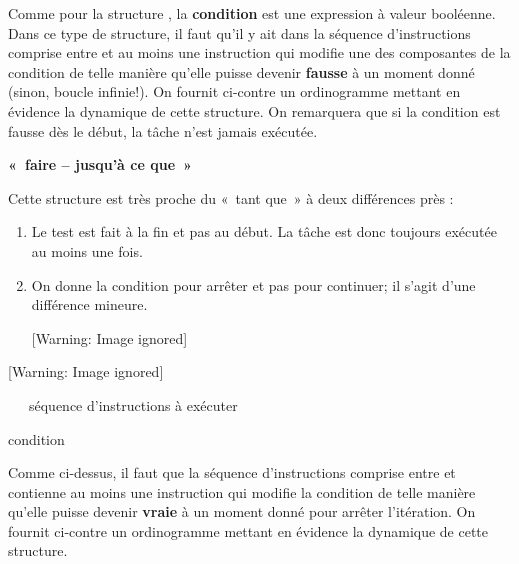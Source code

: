 {\sffamily
{}}


\bigskip

{
Comme pour la structure , la \textbf{condition} est
une expression à valeur booléenne. Dans ce type de structure, il faut
qu’il y ait dans la séquence d’instructions comprise entre
 et  au moins une
instruction qui modifie une des composantes de la condition de telle
manière qu’elle puisse devenir \textbf{fausse} à un moment donné
(sinon, boucle infinie!). On fournit ci-contre un ordinogramme mettant
en évidence la dynamique de cette structure. On remarquera que si la
condition est fausse dès le début, la tâche n'est
jamais exécutée.}

{\sffamily\bfseries\upshape
«~faire – jusqu'à ce que~»}

{
Cette structure est très proche du «~tant que~» à deux différences près
:}

\liststyleNumberingi
\begin{enumerate}
\item {
Le test est fait à la fin et pas au début. La tâche est donc toujours
exécutée au moins une fois. }
\item {
On donne la condition pour arrêter et pas pour continuer; il
s'agit d'une différence mineure.}
\begin{center}
 [Warning: Image ignored] %

\end{center}
\end{enumerate}

\bigskip

{\sffamily
{}}

\begin{center}
 [Warning: Image ignored] %

\end{center}
{\sffamily
\ \  \ séquence d’instructions à exécuter }

{\sffamily
{} condition}


\bigskip

{
Comme ci-dessus, il faut que la séquence d’instructions comprise entre
 et  contienne au moins une instruction qui modifie la condition de
telle manière qu’elle puisse devenir \textbf{vraie} à un moment donné
pour arrêter l'itération. On fournit ci-contre un
ordinogramme mettant en évidence la dynamique de cette structure.}

